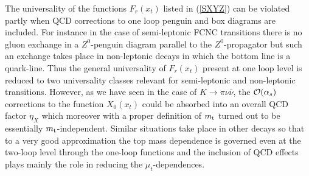 \documentclass[12pt]{article}
\def\as{\alpha_s}
\newcommand{\mt}{m_{\rm t}}
\newcommand{\ord}{{\cal O}}
\begin{document}
\begin{itemize}
\begin{itemize}
The universality of the functions $F_r(x_t)$ listed in (\ref{SXYZ})
can be violated partly when QCD corrections to one loop penguin
and box diagrams are included. For instance in the case of
semi-leptonic FCNC transitions there is no gluon exchange in
a $Z^0$-penguin diagram parallel to the $Z^0$-propagator but
such an exchange takes place in non-leptonic decays in which the
bottom line is a quark-line. Thus the general universality of $F_r(x_t)$
present at one loop level is reduced to two universality classes
relevant for semi-leptonic and non-leptonic transitions.
However, as we have seen in the case of $K\to\pi\nu\bar\nu$,
the $\ord(\as)$ corrections to the function $X_0(x_t)$ could
be absorbed into an overall QCD factor $\eta_X$ which moreover
with a proper definition of $\mt$ turned out to be essentially
$\mt$-independent. Similar situations take place in other decays
so that to a very good approximation the top mass dependence is
governed even at the two-loop level through the one-loop functions
and the inclusion of QCD effects plays mainly the role in reducing 
the $\mu_t$-dependences.


\end{itemize}
\end{itemize}
\end{document}
